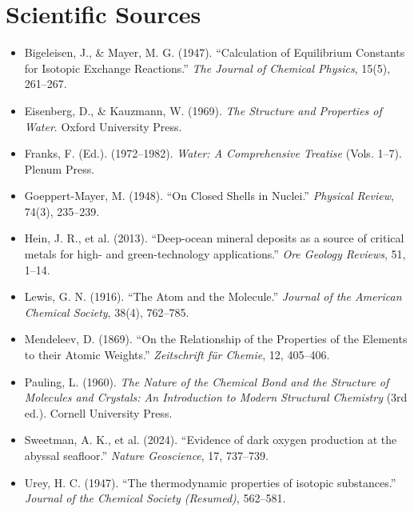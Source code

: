 \documentclass[11pt, letterpaper, openany]{book}
\begin{document}
\section*{Scientific Sources}

\begin{itemize}

    \item Bigeleisen, J., \& Mayer, M. G. (1947). “Calculation of Equilibrium Constants for Isotopic Exchange Reactions.” \textit{The Journal of Chemical Physics}, 15(5), 261–267.

    \item Eisenberg, D., \& Kauzmann, W. (1969). \textit{The Structure and Properties of Water}. Oxford University Press.

    \item Franks, F. (Ed.). (1972–1982). \textit{Water: A Comprehensive Treatise} (Vols. 1–7). Plenum Press.

    \item Goeppert-Mayer, M. (1948). “On Closed Shells in Nuclei.” \textit{Physical Review}, 74(3), 235–239.

    \item Hein, J. R., et al. (2013). “Deep-ocean mineral deposits as a source of critical metals for high- and green-technology applications.” \textit{Ore Geology Reviews}, 51, 1–14.

    \item Lewis, G. N. (1916). “The Atom and the Molecule.” \textit{Journal of the American Chemical Society}, 38(4), 762–785.

    \item Mendeleev, D. (1869). “On the Relationship of the Properties of the Elements to their Atomic Weights.” \textit{Zeitschrift für Chemie}, 12, 405–406.

    \item Pauling, L. (1960). \textit{The Nature of the Chemical Bond and the Structure of Molecules and Crystals: An Introduction to Modern Structural Chemistry} (3rd ed.). Cornell University Press.

    \item Sweetman, A. K., et al. (2024). “Evidence of dark oxygen production at the abyssal seafloor.” \textit{Nature Geoscience}, 17, 737–739.

    \item Urey, H. C. (1947). “The thermodynamic properties of isotopic substances.” \textit{Journal of the Chemical Society (Resumed)}, 562–581.

\end{itemize}
\end{document}

